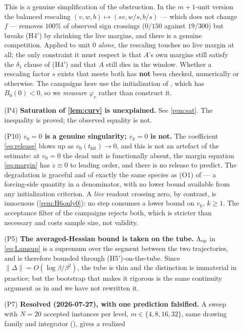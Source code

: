 \documentclass[11pt]{article}
\theoremstyle{remark}
\newcommand{\thit}{t_{\mathrm{hit}}}
\newcommand{\hyplabel}[1]{\textup{(#1)}}
\begin{document}
\begin{itemize}
This is a genuine simplification of the obstruction. In the $m+1$-unit version
the balanced rescaling $(v,w,b)\mapsto(sv,w/s,b/s)$ --- which does not change
$f$ --- removes $100\%$ of observed sign crossings ($0/150$ against $19/300$)
but breaks \hyplabel{H4$'$} by shrinking the live margins, and there is a
genuine competition. Applied to unit $0$ \emph{alone}, the rescaling touches no
live margin at all; the only constraint it must respect is that $A$'s own
margins still satisfy the $\delta_1$ clause of \hyplabel{H4$'$} and that $A$
still dies in the window. Whether a rescaling factor $s$ exists that meets both
has \textbf{not} been checked, numerically or otherwise. The campaigns here use
the initialization of \cite{paper}, which has $B_0(0)<0$, so we \emph{measure}
$\varphi_v$ rather than construct it.
\item[(P4)] \textbf{Saturation of \cref{lem:curv} is unexplained.} See
\cref{rem:sat}. The inequality is proved; the observed equality is not.
\item[(P10)] \textbf{$v_0=0$ is a genuine singularity; $v_k=0$ is not.} The
coefficient \eqref{eq:release} blows up as $v_0(\thit)\to0$, and this is not an
artefact of the estimate: at $v_0=0$ the dead unit is functionally absent, the
margin equation \eqref{eq:margin} has $\dot z\equiv0$ to leading order, and
there is no release to predict. The degradation is graceful and of exactly the
same species as (O1) of \cite{paper} --- a forcing-side quantity in a
denominator, with no lower bound available from any initialization criterion.
A \emph{live} readout crossing zero, by contrast, is innocuous
(\cref{rem:H6only0}): no step consumes a lower bound on $v_k$, $k\ge1$. The
acceptance filter of the campaigns rejects both, which is stricter than
necessary and costs sample size, not validity.
\item[(P5)] \textbf{The averaged-Hessian bound is taken on the tube.} $\Lambda_{\rm ep}$
in \eqref{eq:Lamsup} is a supremum over the segment between the two
trajectories, and is therefore bounded through \hyplabel{H5$'$}-on-the-tube.
Since $\|\Delta\|=O(\log\beta/\beta^2)$, the tube is thin and the distinction is
immaterial in practice; but the bootstrap that makes it rigorous is the same
continuity argument as in \cite[L4$'$]{paper} and we have not rewritten it.
\item[(P7)] \textbf{Resolved (2026-07-27), with one prediction falsified.}
A sweep with $N=20$ accepted instances per level, $m\in\{4,8,16,32\}$, same
drawing family and integrator (), gives a realized

\end{itemize}
\end{document}
